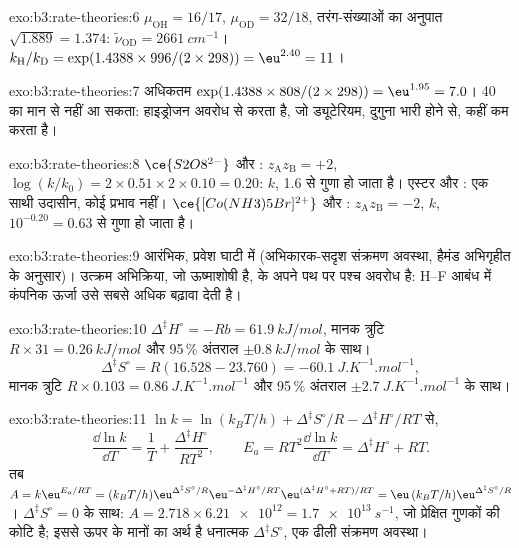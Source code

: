 \begin{solution}{exo:b3:rate-theories:6}
$\mu_{\mathrm{OH}} = 16/17$, $\mu_{\mathrm{OD}} = 32/18$, तरंग-संख्याओं का अनुपात $\sqrt{1.889} = 1.374$:
$\tilde\nu_{\mathrm{OD}} = \qty{2661}{cm^{-1}}$। $k_{\mathrm H}/k_{\mathrm D} = \exp(1.4388 \times 996/(2 \times 298)) = \eu^{2.40} = 11$।
\end{solution}

\begin{solution}{exo:b3:rate-theories:7}
अधिकतम $\exp(1.4388 \times 808/(2 \times 298)) = \eu^{1.95} = 7.0$। 40 का मान
 से नहीं आ सकता: हाइड्रोजन अवरोध से  करता है, जो ड्यूटेरियम,
दुगुना भारी होने से, कहीं कम करता है।
\end{solution}

\begin{solution}{exo:b3:rate-theories:8}
$\ce{S2O8^{2-}}$ और : $z_{\mathrm A}z_{\mathrm B} = +2$, $\log(k/k_0) = 2 \times 0.51 \times 2 \times 0.10 = 0.20$: $k$,
1.6 से गुणा हो जाता है। एस्टर और : एक साथी उदासीन, कोई प्रभाव नहीं।
$\ce{[Co(NH3)5Br]^{2+}}$ और : $z_{\mathrm A}z_{\mathrm B} = -2$, $k$, $10^{-0.20} = 0.63$ से गुणा हो जाता है।
\end{solution}

\begin{solution}{exo:b3:rate-theories:9}
आरंभिक, प्रवेश घाटी में (अभिकारक-सदृश संक्रमण अवस्था, हैमंड
अभिगृहीत के अनुसार)। उत्क्रम अभिक्रिया, जो ऊष्माशोषी है, के अपने
पथ पर पश्च अवरोध है: H--F आबंध में कंपनिक ऊर्जा उसे सबसे अधिक बढ़ावा देती है।
\end{solution}

\begin{solution}{exo:b3:rate-theories:10}
$\Delta^{\ddagger}H^\circ = -Rb = \qty{61.9}{kJ/mol}$, मानक त्रुटि $R \times 31 = \qty{0.26}{kJ/mol}$ और
95\,\% अंतराल $\pm\qty{0.8}{kJ/mol}$ के साथ।
\[
  \Delta^{\ddagger}S^\circ = R(16.528 - 23.760) = \qty{-60.1}{J.K^{-1}.mol^{-1}},
\]
मानक त्रुटि $R \times 0.103 = \qty{0.86}{J.K^{-1}.mol^{-1}}$ और 95\,\% अंतराल $\pm\qty{2.7}{J.K^{-1}.mol^{-1}}$ के साथ।
\end{solution}

\begin{solution}{exo:b3:rate-theories:11}
$\ln k = \ln(k_BT/h) + \Delta^{\ddagger}S^\circ/R - \Delta^{\ddagger}H^\circ/RT$ से,
\[
  \frac{\dd\ln k}{\dd T} = \frac1T + \frac{\Delta^{\ddagger}H^\circ}{RT^2}, \qquad
  E_a = RT^2\frac{\dd\ln k}{\dd T} = \Delta^{\ddagger}H^\circ + RT .
\] तब $A = k\eu^{E_a/RT} = (k_BT/h)\eu^{\Delta^{\ddagger}S^\circ/R}\eu^{-\Delta^{\ddagger}H^\circ/RT}\eu^{(\Delta^{\ddagger}H^\circ + RT)/RT} =
\eu\,(k_BT/h)\eu^{\Delta^{\ddagger}S^\circ/R}$। $\Delta^{\ddagger}S^\circ = 0$ के साथ: $A = 2.718 \times \num{6.21e12} = \qty{1.7e13}{s^{-1}}$, जो
प्रेक्षित गुणकों की कोटि है; इससे ऊपर के मानों का अर्थ है धनात्मक $\Delta^{\ddagger}S^\circ$, एक ढीली
संक्रमण अवस्था।
\end{solution}

